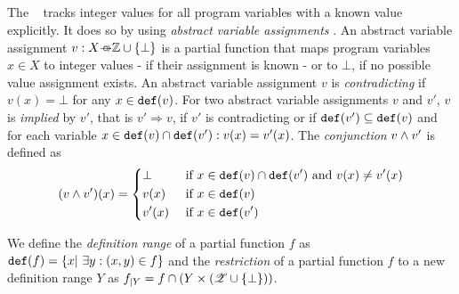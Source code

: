 \subsection{\ValueAnalysisCPA}\label{sec:valueAnalysis}
The \ \cite{Beyer2013} tracks integer values for all program variables with a known value explicitly.
It does so by using \emph{abstract variable assignments} \cite{Beyer2013}. An abstract variable assignment $v: X \partialFunc \integerset \cup \{\bot\}$ is a partial function that maps program variables $x \in X$ to integer values - if their assignment is known - or to $\bot$, if no possible value assignment exists.
An abstract variable assignment $v$ is \emph{contradicting} if $v(x) = \bot$ for any $x \in \texttt{def}(v)$.
For two abstract variable assignments $v$ and $v'$, $v$ is \emph{implied} by $v'$, that is $v' \Rightarrow v$, if $v'$ is contradicting or if $\texttt{def}(v') \subseteq \texttt{def}(v)$ and for each variable $x \in \texttt{def}(v) \cap \texttt{def}(v') : v(x) = v'(x)$.
The \emph{conjunction} $v \wedge v'$ is defined as
\[(v \wedge v')(x) = \begin{dcases}
	\bot & \text{ if } x \in \texttt{def}(v) \cap \texttt{def}(v') \text{ and } v(x) \neq v'(x)\\
	v(x) & \text{ if } x \in \texttt{def}(v)\\
	v'(x) & \text{ if } x \in \texttt{def}(v')
\end{dcases}\]

We define the \emph{definition range} of a partial function $f$ as $\texttt{def}(f) = \{ x |\ \exists y : (x, y) \in f \}$ and
the \emph{restriction} of a partial function $f$ to a new definition range $Y$ as $f_{|Y} = f \cap ( Y \times (\mathscr{Z} \cup \{ \bot \}))$.

